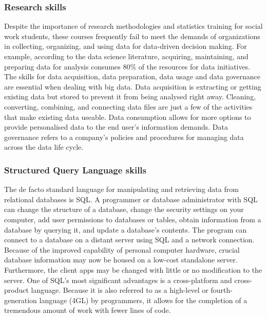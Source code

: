 \documentclass[a4paper, 11pt]{report}
\begin{document}
\subsubsection{Research skills}
Despite the importance of research methodologies and statistics training for social work students, these courses frequently fail to meet the demands of organizations in collecting, organizing, and using data for data-driven decision making. For example, according to the data science literature, acquiring, maintaining, and preparing data for analysis consumes 80\% of the resources for data initiatives. \cite{(Perron, Victor, Hiltz, & Ryan, 2020)} The skills for data acquisition, data preparation, data usage and data governance are essential when dealing with big data. Data acquisition is extracting or getting existing data but stored to prevent it from being analysed right away. Cleaning, converting, combining, and connecting data files are just a few of the activities that make existing data useable. Data consumption allows for more options to provide personalised data to the end user's information demands. Data governance refers to a company's policies and procedures for managing data across the data life cycle. \cite{(Perron, Victor, Hiltz, & Ryan, 2020)}\\
\subsubsection{Structured Query Language skills}
The de facto standard language for manipulating and retrieving data from relational databases is SQL. A programmer or database administrator with SQL can change the structure of a database, change the security settings on your computer, add user permissions to databases or tables, obtain information from a database by querying it, and update a database's contents. The program can connect to a database on a distant server using SQL and a network connection. Because of the improved capability of personal computer hardware, crucial database information may now be housed on a low-cost standalone server. Furthermore, the client apps may be changed with little or no modification to the server. One of SQL's most significant advantages is a cross-platform and cross-product language. Because it is also referred to as a high-level or fourth-generation language (4GL) by programmers, it allows for the completion of a tremendous amount of work with fewer lines of code. \cite{(Stephens & Plew, 2003)}\\
\end{document}
